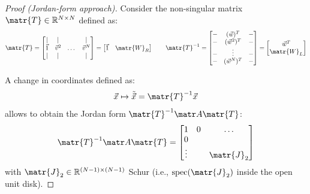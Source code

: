 \begin{theorem}
\begin{proof}[Proof (Jordan-form approach)]
        Consider the non-singular matrix $\matr{T} \in \R^{N \times N}$ defined as:
        \[
            \matr{T} = \begin{bmatrix}
                \vert & \vert & & \vert \\
                \vec{1} & \v^2 & \dots & \v^N \\
                \vert & \vert & & \vert \\
            \end{bmatrix} = \begin{bmatrix}
                \vec{1} & \matr{W}_R
            \end{bmatrix}
            \qquad
            \matr{T}^{-1} = \begin{bmatrix}
                - & (\w)^T & - \\
                - & (\w^2)^T & - \\
                - & \vdots & - \\
                - & (\w^N)^T & - \\
            \end{bmatrix} = \begin{bmatrix}
                \w^T \\ \matr{W}_L
            \end{bmatrix}
        \]
    
        A change in coordinates defined as:
        \[
            \x \mapsto \tilde{\x} = \matr{T}^{-1} \x
        \]
        allows to obtain the Jordan form $\matr{T}^{-1}\A\matr{T}$:
        \[
            \matr{T}^{-1}\A\matr{T} = \begin{bmatrix}
                1 & 0 & \dots \\
                0 & & \\
                \vdots & & \matr{J}_2 \\
            \end{bmatrix}
        \]
        with $\matr{J}_2 \in \mathbb{R}^{(N-1) \times (N-1)}$ Schur (i.e., $\text{spec}(\matr{J}_2)$ inside the open unit disk).
    

\end{proof}
\end{theorem}
